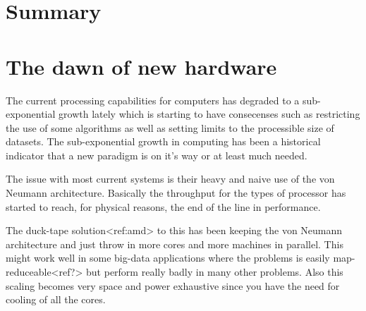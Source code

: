 \documentclass{article}
\begin{document}

%
% 


\section{Summary}

\section{The dawn of new hardware}
    The current processing capabilities for computers has degraded to a
    sub-exponential growth lately which is starting to have consecenses such as 
    restricting the use of some algorithms as well as setting limits 
    to the processible size of datasets.
    The sub-exponential growth in computing has been a historical indicator
    that a new paradigm is on it's way or at least much
    needed.%
    
    The issue with most current systems is their heavy and naive use of the von
    Neumann architecture. Basically the throughput for the types of processor
    has started to reach, for physical reasons, the end of the line in
    performance.

    The duck-tape solution<ref:amd> to this has been keeping the von Neumann
    architecture and just throw in more cores and more machines in parallel.
    This might work well in some big-data applications where the problems is easily
    map-reduceable<ref?> but perform really badly in many other problems. Also
    this scaling becomes very space and power exhaustive since you have the need for
    cooling of all the cores.
\end{document}
